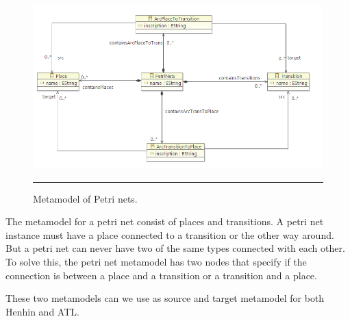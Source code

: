 \begin{figure}[htbp]
  \centering
    \includegraphics[scale=0.5]{./Figures/PetriNetsMetamodel.png}
    \rule{35em}{0.5pt}
  \caption[Metamodel of Petri nets.]{Metamodel of Petri nets.}
  \label{fig:ActivityMetamodel}
\end{figure}

The metamodel for a petri net consist of places and transitions. A petri net
instance must have a place connected to a transition or the other way around.
But a petri net can never have two of the same types connected with each other.
To solve this, the petri net metamodel has two nodes that specify if the
connection is between a place and a transition or a transition and a place.

These two metamodels can we use as source and target metamodel for
both Henhin and ATL. 